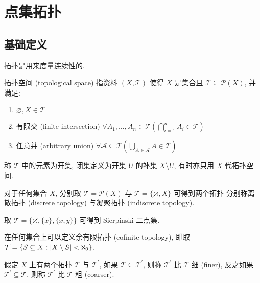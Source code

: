 \section{点集拓扑}

\subsection{基础定义}

拓扑是用来度量连续性的.

\begin{definition}[拓扑空间]
    拓扑空间 (topological space) 指资料 \((X,\mathcal{T})\) 使得 \(X\) 是集合且 \(\mathcal{T} \subseteq \mathcal{P}(X)\), 并满足:
    \begin{enumerate}
        \item \(\varnothing, X \in \mathcal{T}\)
        \item 有限交 (finite intersection) \(\forall A_1, \dots, A_n \in \mathcal{T} (\bigcap_{i=1}^n A_i \in \mathcal{T})\)
        \item 任意并 (arbitrary union) \(\forall \mathcal{A} \subseteq \mathcal{T} (\bigcup_{A \in \mathcal{A}} A \in \mathcal{T})\)
    \end{enumerate}
    称 \(\mathcal{T}\) 中的元素为开集, 闭集定义为开集 \(U\) 的补集 \(X \setminus U\), 有时亦只用 \(X\) 代拓扑空间.
\end{definition}

\begin{definition}
    对于任何集合 \(X\), 分别取 \(\mathcal{T} = \mathcal{P} (X)\) 与 \(\mathcal{T} = \{\varnothing,X\}\) 可得到两个拓扑
    分别称离散拓扑 (discrete topology) 与凝聚拓扑 (indiscrete topology).
\end{definition}

\begin{example}
    \label {example:sierpinski two point set}
    取 \(\mathcal{T} = \{\varnothing, \{x\}, \{x,y\}\}\) 可得到 Sierpinski 二点集.
\end{example}

\begin{example}
    在任何集合上可以定义余有限拓扑 (cofinite topology), 即取 \(\mathcal{T} = \{S \subseteq X : \abs{X \setminus S} < \aleph_0\}\).
\end{example}

\begin{definition}
    假定 \(X\) 上有两个拓扑 \(\mathcal{T}\) 与 \(\mathcal{T}^\prime\), 如果 \(\mathcal{T} \subseteq \mathcal{T}^\prime\), 则称 \(\mathcal{T}^\prime\) 比 \(\mathcal{T}\) 细 (finer),
    反之如果 \(\mathcal{T}^\prime \subseteq \mathcal{T}\), 则称 \(\mathcal{T}^\prime\) 比 \(\mathcal{T}\) 粗 (coarser).
\end{definition}

